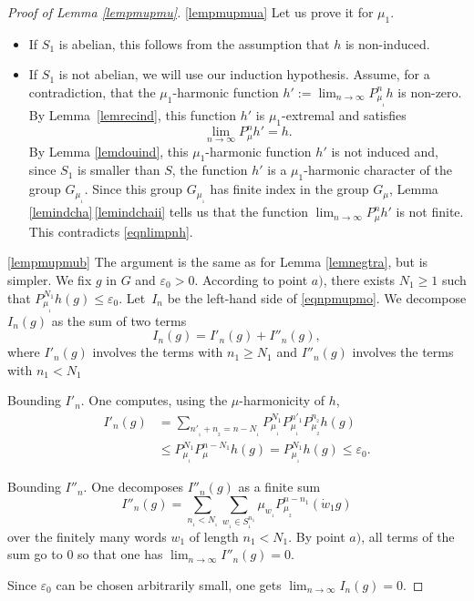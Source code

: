 \documentclass[11pt]{article}
\newcommand{\skpt}{\smallskip}
\numberwithin{equation}{section}
\theoremstyle{definition}
\let\eps\varepsilon
\let\ra\to
\begin{document}
\skpt
\begin{proof}[Proof of Lemma \ref{lempmupmu}]
\eqref{lempmupmua}
Let us prove it for $\mu_1$.

\begin{itemize}
\item
If $S_1$ is abelian, this follows from the assumption that $h$ is non-induced.

\item
If $S_1$ is not abelian,
we will use our induction hypothesis. Assume, for a contradiction, that
the $\mu_1$-harmonic function $h':=\lim_{n\ra\infty}P^{n}_{\mu_{_1}}h$
is non-zero. By Lemma~\ref{lemrecind},
this function $h'$ is $\mu_1$-extremal and satisfies
\begin{equation}
\label{eqnlimpnh}
\lim_{n\ra\infty}P^{n}_{\mu}h'=h.
\end{equation}
By Lemma \ref{lemdouind}, this $\mu_1$-harmonic function $h'$ is not induced and,
since $S_1$ is smaller than $S$,
the function $h'$ is a $\mu_1$-harmonic character
of the group $G_{\mu_{_1}}$.
Since this group $G_{\mu_{_1}}$ has finite index in the group $G_\mu$, Lemma \ref{lemindcha}\,\eqref{lemindchaii}
tells us that the function $\lim_{n\ra\infty}P^{n}_{\mu}h'$ is not finite.
This contradicts \eqref{eqnlimpnh}.
\end{itemize}

\eqref{lempmupmub}
The argument is the same as for Lemma \ref{lemnegtra}, but is simpler.
We fix $g$ in $G$ and $\eps_0>0$.
According to point $a)$, there exists $N_1\geq 1$ such that
$P^{N_1}_{\mu_{_1}}h(g)\leq \eps_0$.
Let~$I_n$ be the left-hand side of \eqref{eqnpmupmo}.
We decompose $I_n(g)$
as the sum of two terms
\[
I_n(g)=I'_n(g)+I''_n(g),
\]
where $I'_n(g)$ involves the terms with $n_1\geq N_1$
and $I''_n(g)$ involves the terms with $n_1 < N_1$

Bounding $I'_n$. One computes, using the $\mu$-harmonicity of $h$,
\begin{align*}
I'_{n}(g)&=
\sum_{n'_{_1}+n_{_2}=n-N_{_1}}
P^{N_1}_{\mu_{_1}}P^{n'_1}_{\mu_{_1}}P^{n_{_2}}_{\mu_{_2}}h(g)\\
&\leq
P^{N_1}_{\mu_{_1}}P^{n-N_1}_{\mu}h(g)
= P^{N_1}_{\mu_{_1}}h(g)\leq \eps_0.
\end{align*}

Bounding $I''_n$. One decomposes $I''_n(g)$ as a finite sum
\[
I''_{n}(g)=\sum_{n_{_1}<N_{_1}}\sum_{w_{_1}\in S_{_1}^{n_1}} \mu_{w_{_1}}P^{n-n_1}_{\mu_{_2}}(\dot{w}_{1}g)
\]
over the finitely many words $w_1$ of length $n_1<N_1$.
By point $a)$, all terms of the sum go to $0$ so that one has
$\lim_{n\ra\infty}I''_{n}(g)=0$.

Since $\eps_0$ can be chosen arbitrarily small, one gets
$\lim_{n\ra\infty}I_{n}(g)=0$.
\end{proof}
\end{document}
